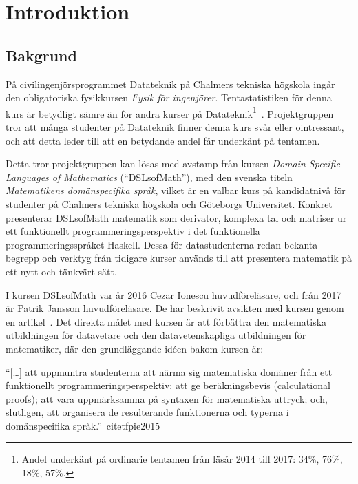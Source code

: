 
\chapter{Introduktion}

\begin{binge}
\end{binge}

\section{Bakgrund}

\begin{draft}

På civilingenjörsprogrammet Datateknik på Chalmers tekniska högskola ingår den obligatoriska
fysikkursen \textit{Fysik för ingenjörer}. Tentastatistiken för denna kurs är
betydligt sämre än för andra kurser på Datateknik\footnote{Andel underkänt på
ordinarie tentamen från läsår 2014 till 2017: 34\%, 76\%, 18\%, 57\%.
}~\cite{tentastatistik}. Projektgruppen tror att många studenter på Datateknik finner denna
kurs svår eller ointressant, och att detta leder till att en betydande andel får
underkänt på tentamen.

Detta tror projektgruppen kan lösas med avstamp från kursen \textit{Domain
Specific Languages of Mathematics} (``DSLsofMath''), med den svenska titeln
\textit{Matematikens domänspecifika språk}, vilket är en valbar kurs på
kandidatnivå för studenter på Chalmers tekniska högskola och Göteborgs Universitet. Konkret
presenterar DSLsofMath matematik som derivator, komplexa tal och
matriser ur ett funktionellt programmeringsperspektiv i det funktionella
programmeringsspråket Haskell. Dessa för datastudenterna redan bekanta begrepp
och verktyg från tidigare kurser används till att presentera matematik på ett nytt och tänkvärt sätt.

I kursen DSLsofMath var år 2016 Cezar Ionescu huvudföreläsare, och från
2017 är Patrik Jansson huvudföreläsare. De har beskrivit avsikten med kursen
genom en artikel~\cite{tfpie2015}. Det direkta målet med kursen är
att förbättra den matematiska utbildningen för datavetare och den
datavetenskapliga utbildningen för matematiker, där den grundläggande idéen
bakom kursen är:

\begin{center} ``[\dots] att uppmuntra studenterna att närma sig matematiska
  domäner från ett funktionellt programmeringsperspektiv: att ge beräkningsbevis
  (calculational proofs); att vara uppmärksamma på syntaxen för matematiska
  uttryck; och, slutligen, att organisera de resulterande funktionerna och
typerna i domänspecifika språk.''~cite{tfpie2015}~\cite{lecture-notes}\
\end{center}


\end{draft}
